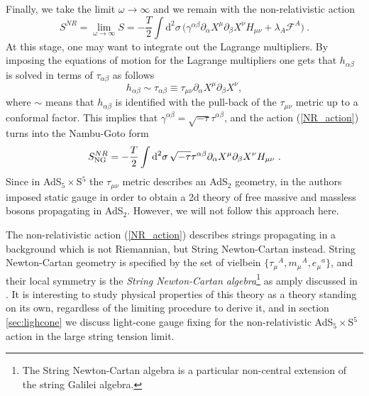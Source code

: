 \documentclass[12pt]{article}
\def\dd{\text{d}}
\numberwithin{equation}{section}
\begin{document}
Finally, we take the limit $\omega\rightarrow \infty$ and we remain with the non-relativistic action
\begin{equation}
\label{NR_action}
S^{NR} = \lim_{\omega\rightarrow \infty} S =- \frac{T}{2} \int \dd^2 \sigma \, \bigg( \gamma^{\alpha\beta}\partial_{\alpha} X^{\mu} \partial_{\beta} X^{\nu} H_{\mu\nu} + \lambda_A \mathcal{F}^A \bigg) \ . 
\end{equation}
At this stage, one may want to integrate out the Lagrange multipliers. By imposing the equations of motion for the Lagrange multipliers one gets that $h_{\alpha\beta}$ is solved in terms of $\tau_{\alpha\beta}$ as follows
\begin{equation}
h_{\alpha\beta} \sim \tau_{\alpha\beta} \equiv \tau_{\mu\nu} \partial_{\alpha} X^{\mu}\partial_{\beta} X^{\nu} , 
\end{equation}
where $\sim$ means that $h_{\alpha\beta}$ is identified with the pull-back of the $\tau_{\mu\nu}$ metric up to a conformal factor. This implies that 
$\gamma^{\alpha\beta} = \sqrt{-\tau} \tau^{\alpha\beta}$, and the action (\ref{NR_action}) turns into the Nambu-Goto form
\begin{equation}
S^{NR}_{\footnotesize\text{NG}} = - \frac{T}{2} \int \dd^2 \sigma \,  \sqrt{-\tau}\tau^{\alpha\beta}\partial_{\alpha} X^{\mu} \partial_{\beta} X^{\nu} H_{\mu\nu}  \ . 
\end{equation}
Since in AdS$_5\times$S$^5$ the $\tau_{\mu\nu}$ metric describes an AdS$_2$ geometry,  in \cite{Gomis:2005pg} the authors imposed static gauge in order to obtain a 2d theory of free massive and massless bosons propagating in AdS$_2$. However, we will not follow this approach here. 

The non-relativistic action (\ref{NR_action}) describes strings propagating in a background which is not Riemannian, but String Newton-Cartan instead. String Newton-Cartan geometry is specified by the set of vielbein $\{ \tau_{\mu}{}^A , m_{\mu}{}^A, e_{\mu}{}^a\}$, and their local symmetry is the \emph{String Newton-Cartan algebra}\footnote{The String Newton-Cartan algebra is a particular non-central extension of the string Galilei algebra.} as amply discussed in \cite{Bergshoeff:2019pij}.  It is interesting to study physical properties of this theory as a theory standing on its own,  regardless of the limiting procedure to derive it, and in section \ref{sec:lighcone} we discuss light-cone gauge fixing for the non-relativistic AdS$_5\times$S$^5$ action in the large string tension limit. 
\end{document}
